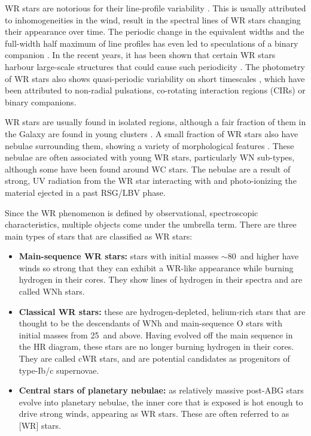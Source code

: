 WR stars are notorious for their line-profile variability \citep{lepine_wind_1996,lepine_wind_2000,st-louis_systematic_2009,chene_systematic_2011,chene_clumping_2020}. This is usually attributed to inhomogeneities in the wind, result in the spectral lines of WR stars changing their appearance over time. The periodic change in the equivalent widths and the full-width half maximum of line profiles has even led to speculations of a binary companion \citep[e.g. WR 1][]{morel_investigation_1999}. In the recent years, it has been shown that certain WR stars harbour large-scale structures that could cause such periodicity \citep[e.g.][]{st-louis_measuring_2008,aldoretta_extensive_2016,st-louis_polarization_2018}. The photometry of WR stars also shows quasi-periodic variability on short timescales \citep[e.g.][]{moffat_photometric_1986,balona_intensive_1989,st-louis_brite_2020}, which have been attributed to non-radial pulsations, co-rotating interaction regions (CIRs) or binary companions. 

WR stars are usually found in isolated regions, although a fair fraction of them in the Galaxy are found in young clusters \citep{rosslowe_spatial_2015}. A small fraction of WR stars also have nebulae surrounding them, showing a variety of morphological features \citep{toala_wise_2015}. These nebulae are often associated with young WR stars, particularly WN sub-types, although some have been found around WC stars. The nebulae are a result of strong, UV radiation from the WR star interacting with and photo-ionizing the material ejected in a past RSG/LBV phase. 

Since the WR phenomenon is defined by observational, spectroscopic characteristics, multiple objects come under the umbrella term. There are three main types of stars that are classified as WR stars:

\begin{itemize}
    \item \textbf{Main-sequence WR stars:} stars with initial masses ${\sim}80\,$\Msun{} and higher have winds so strong that they can exhibit a WR-like appearance while burning hydrogen in their cores. They show lines of hydrogen in their spectra and are called WNh stars.
    \item \textbf{Classical WR stars:} these are hydrogen-depleted, helium-rich stars that are thought to be the descendants of WNh and main-sequence O stars with initial masses from 25\,\Msun{} and above. Having evolved off the main sequence in the HR diagram, these stars are no longer burning hydrogen in their cores. They are called cWR stars, and are potential candidates as progenitors of type-Ib/c supernovae. 
    \item \textbf{Central stars of planetary nebulae:} as relatively massive post-ABG stars evolve into planetary nebulae, the inner core that is exposed is hot enough to drive strong winds, appearing as WR stars. These are often referred to as [WR] stars.
\end{itemize}

